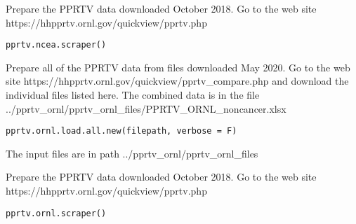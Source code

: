 \documentclass[letterpaper]{book}
\begin{document}
%
\begin{Description}\relax
Prepare the PPRTV data downloaded October 2018. Go to the web site
https://hhpprtv.ornl.gov/quickview/pprtv.php
\end{Description}
%
\begin{Usage}
\begin{verbatim}
pprtv.ncea.scraper()
\end{verbatim}
\end{Usage}
%
\begin{Description}\relax
Prepare all of the PPRTV data from files downloaded May 2020. Go to the web site
https://hhpprtv.ornl.gov/quickview/pprtv\_compare.php and download the individual
files listed here. The combined data is in the file
../pprtv\_ornl/pprtv\_ornl\_files/PPRTV\_ORNL\_noncancer.xlsx
\end{Description}
%
\begin{Usage}
\begin{verbatim}
pprtv.ornl.load.all.new(filepath, verbose = F)
\end{verbatim}
\end{Usage}
%
\begin{Arguments}
\begin{ldescription}
\item[\code{filepath}] The input files are in path ../pprtv\_ornl/pprtv\_ornl\_files
\end{ldescription}
\end{Arguments}
%
\begin{Description}\relax
Prepare the PPRTV data downloaded October 2018. Go to the web site
https://hhpprtv.ornl.gov/quickview/pprtv.php
\end{Description}
%
\begin{Usage}
\begin{verbatim}
pprtv.ornl.scraper()
\end{verbatim}
\end{Usage}
\end{document}
